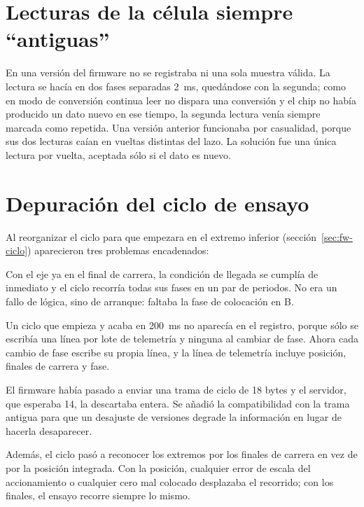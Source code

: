 \section{Lecturas de la célula siempre ``antiguas''}

En una versión del firmware no se registraba ni una sola muestra válida. La lectura se hacía en dos
fases separadas \SI{2}{\milli\second}, quedándose con la segunda; como en modo de conversión
continua leer no dispara una conversión y el chip no había producido un dato nuevo en ese tiempo, la
segunda lectura venía siempre marcada como repetida. Una versión anterior funcionaba por casualidad,
porque sus dos lecturas caían en vueltas distintas del lazo. La solución fue una única lectura por
vuelta, aceptada sólo si el dato es nuevo.

\section{Depuración del ciclo de ensayo}
\label{sec:prob-ciclo}

Al reorganizar el ciclo para que empezara en el extremo inferior (sección~\ref{sec:fw-ciclo})
aparecieron tres problemas encadenados:

\begin{description}[style=nextline,leftmargin=1.5em]
  \item[El ciclo terminaba sin hacer nada] Con el eje ya en el final de carrera, la condición de
        llegada se cumplía de inmediato y el ciclo recorría todas sus fases en un par de periodos.
        No era un fallo de lógica, sino de arranque: faltaba la fase de colocación en B.
  \item[No quedaba rastro en el registro] Un ciclo que empieza y acaba en \SI{200}{\milli\second} no
        aparecía en el registro, porque sólo se escribía una línea por lote de telemetría y ninguna
        al cambiar de fase. Ahora cada cambio de fase escribe su propia línea, y la línea de
        telemetría incluye posición, finales de carrera y fase.
  \item[La interfaz no mostraba la fase] El firmware había pasado a enviar una trama de ciclo de 18
        bytes y el servidor, que esperaba 14, la descartaba entera. Se añadió la compatibilidad con
        la trama antigua para que un desajuste de versiones degrade la información en lugar de
        hacerla desaparecer.
\end{description}

Además, el ciclo pasó a reconocer los extremos por los finales de carrera en vez de por la posición
integrada. Con la posición, cualquier error de escala del accionamiento o cualquier cero mal
colocado desplazaba el recorrido; con los finales, el ensayo recorre siempre lo mismo.

